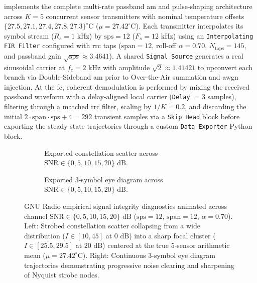 \documentclass[Markos_Delaportas_1316.tex]{subfiles}
\begin{document}
 implements the complete multi-rate passband
\gls{am} and pulse-shaping architecture across $K = 5$ concurrent sensor
transmitters with nominal temperature offsets $\{27.5, 27.1, 27.4,
27.8, 27.3\}^\circ\text{C}$ ($\mu = 27.42^\circ\text{C}$). Each
transmitter interpolates its symbol stream ($R_s = 1\text{ kHz}$) by
$\text{sps} = 12$ ($F_s = 12\text{ kHz}$) using an \texttt{Interpolating
FIR Filter} configured with \gls{rrc} taps ($\text{span} = 12$, roll-off
    $\alpha = 0.70$, $N_{\text{taps}} = 145$, and passband gain
$\sqrt{\text{sps}} \approx 3.4641$). A shared \texttt{Signal Source}
generates a real sinusoidal carrier at $f_c = 2\text{ kHz}$ with
amplitude $\sqrt{2} \approx 1.41421$ to upconvert each branch via
Double-Sideband
\gls{am} prior to Over-the-Air summation and \gls{awgn} injection. At the
\gls{fc}, coherent demodulation is performed by mixing the received
passband waveform with a delay-aligned local carrier (\texttt{Delay} $= 3$
samples), filtering through a matched \gls{rrc} filter, scaling by
$1/K = 0.2$, and discarding the initial $2 \cdot \text{span} \cdot
\text{sps} + 4 = 292$ transient samples via a \texttt{Skip Head} block
before exporting the steady-state trajectories through a custom
\texttt{Data Exporter} Python block.

\begin{figure}[htbp]
    \centering
    \begin{subfigure}{0.48\linewidth}
        \caption{Exported constellation scatter across $\text{SNR}
        \in \{0, 5, 10, 15, 20\}\text{ dB}$.}
        \label{fig:gr_rrc_fc_const}
    \end{subfigure}%
    \hfill
    \begin{subfigure}{0.48\linewidth}
        \caption{Exported 3-symbol eye diagram across $\text{SNR} \in
        \{0, 5, 10, 15, 20\}\text{ dB}$.}
        \label{fig:gr_rrc_fc_eye}
    \end{subfigure}
    \caption{GNU Radio empirical signal integrity diagnostics
        animated across channel $\text{SNR} \in \{0, 5, 10, 15,
        20\}\text{ dB}$ ($\text{sps} = 12$, $\text{span} = 12$, $\alpha =
        0.70$). Left: Strobed constellation scatter collapsing from a
        wide distribution ($I \in [10, 45]$ at $0\text{ dB}$) into a
        sharp focal cluster ($I \in [25.5, 29.5]$ at $20\text{ dB}$)
        centered at the true 5-sensor arithmetic mean ($\mu =
        27.42^\circ\text{C}$). Right: Continuous 3-symbol eye diagram
        trajectories demonstrating progressive noise clearing and
    sharpening of Nyquist strobe nodes.}
    \label{fig:gr_rrc_fc_diagnostics}
\end{figure}
\end{document}
